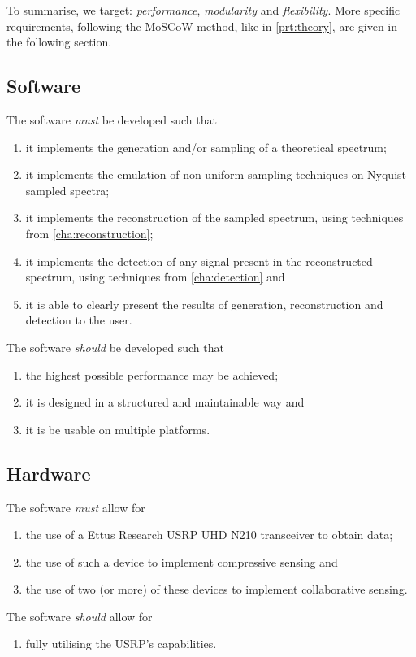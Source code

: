 \documentclass[a4paper, openany, oneside]{memoir}
\begin{document}
To summarise, we target: \emph{performance}, \emph{modularity} and \emph{flexibility}. More specific requirements, following the MoSCoW-method, like in \cref{prt:theory}, are given in the following section.

\subsection{Software}
The software \emph{must} be developed such that
\begin{enumerate}
    \item it implements the generation and/or sampling of a theoretical spectrum;
    \item it implements the emulation of non-uniform sampling techniques on Nyquist-sampled spectra;
    \item it implements the reconstruction of the sampled spectrum, using techniques from \cref{cha:reconstruction};
    \item it implements the detection of any signal present in the reconstructed spectrum, using techniques from \cref{cha:detection} and
    \item it is able to clearly present the results of generation, reconstruction and detection to the user.
\end{enumerate}
The software \emph{should} be developed such that
\begin{enumerate}
    \item the highest possible performance may be achieved;
    \item it is designed in a structured and maintainable way and
    \item it is be usable on multiple platforms.
\end{enumerate}

\subsection{Hardware}
The software \emph{must} allow for
\begin{enumerate}
    \item the use of a Ettus Research USRP UHD N210 transceiver to obtain data;
    \item the use of such a device to implement compressive sensing and
    \item the use of two (or more) of these devices to implement collaborative sensing.
\end{enumerate}

The software \emph{should} allow for
\begin{enumerate}
    \item fully utilising the USRP's capabilities.
\end{enumerate}
\end{document}
